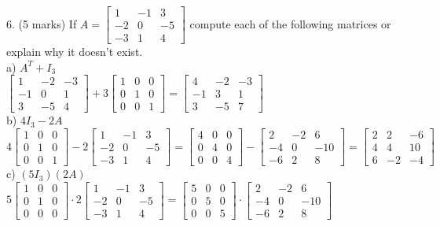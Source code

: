 \documentclass[a4paper]{article}
\begin{document}
6. (5 marks) If $A = \begin{bmatrix}
1&-1&3\\
-2&0&-5\\
-3&1&4
\end{bmatrix}$ compute each of the following matrices or explain why it doesn't exist.\\
a) $A^T + I_3$\\
$\begin{bmatrix}
1&-2&-3\\
-1&0&1\\
3&-5&4
\end{bmatrix} + 3\begin{bmatrix}
1&0&0\\
0&1&0\\
0&0&1
\end{bmatrix} = \begin{bmatrix}
4&-2&-3\\
-1&3&1\\
3&-5&7
\end{bmatrix}$\\
b) $4I_3 - 2A$\\
$4\begin{bmatrix}
1&0&0\\
0&1&0\\
0&0&1
\end{bmatrix} - 2\begin{bmatrix}
1&-1&3\\
-2&0&-5\\
-3&1&4
\end{bmatrix} = \begin{bmatrix}
4&0&0\\
0&4&0\\
0&0&4
\end{bmatrix} - \begin{bmatrix}
2&-2&6\\
-4&0&-10\\
-6&2&8
\end{bmatrix} = \begin{bmatrix}
2&2&-6\\
4&4&10\\
6&-2&-4
\end{bmatrix}$\\
c) $(5I_3)(2A)$\\
$5\begin{bmatrix}
1&0&0\\
0&1&0\\
0&0&0
\end{bmatrix} \cdot 2\begin{bmatrix}
1&-1&3\\
-2&0&-5\\
-3&1&4
\end{bmatrix} = \begin{bmatrix}
5&0&0\\
0&5&0\\
0&0&5
\end{bmatrix} \cdot \begin{bmatrix}
2&-2&6\\
-4&0&-10\\
-6&2&8
\end{bmatrix}$\\
\end{document}
